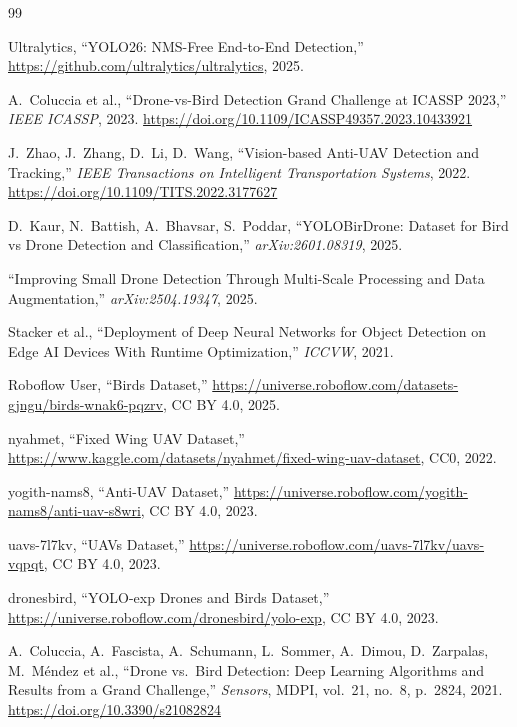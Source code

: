 \documentclass[12pt,a4paper]{report}
\begin{document}
\begin{thebibliography}{99}

Ultralytics, ``YOLO26: NMS-Free End-to-End Detection,''
\url{https://github.com/ultralytics/ultralytics}, 2025.

A.\ Coluccia et al.,
``Drone-vs-Bird Detection Grand Challenge at ICASSP 2023,''
\textit{IEEE ICASSP}, 2023.
\url{https://doi.org/10.1109/ICASSP49357.2023.10433921}

J.\ Zhao, J.\ Zhang, D.\ Li, D.\ Wang,
``Vision-based Anti-UAV Detection and Tracking,''
\textit{IEEE Transactions on Intelligent Transportation Systems}, 2022.
\url{https://doi.org/10.1109/TITS.2022.3177627}

D.\ Kaur, N.\ Battish, A.\ Bhavsar, S.\ Poddar,
``YOLOBirDrone: Dataset for Bird vs Drone Detection and Classification,''
\textit{arXiv:2601.08319}, 2025.

``Improving Small Drone Detection Through Multi-Scale Processing and
Data Augmentation,''
\textit{arXiv:2504.19347}, 2025.

Stacker et al.,
``Deployment of Deep Neural Networks for Object Detection on Edge AI
Devices With Runtime Optimization,''
\textit{ICCVW}, 2021.

Roboflow User, ``Birds Dataset,''
\url{https://universe.roboflow.com/datasets-gjngu/birds-wnak6-pqzrv},
CC BY 4.0, 2025.

nyahmet, ``Fixed Wing UAV Dataset,''
\url{https://www.kaggle.com/datasets/nyahmet/fixed-wing-uav-dataset},
CC0, 2022.

yogith-nams8, ``Anti-UAV Dataset,''
\url{https://universe.roboflow.com/yogith-nams8/anti-uav-s8wri},
CC BY 4.0, 2023.

uavs-7l7kv, ``UAVs Dataset,''
\url{https://universe.roboflow.com/uavs-7l7kv/uavs-vqpqt},
CC BY 4.0, 2023.

dronesbird, ``YOLO-exp Drones and Birds Dataset,''
\url{https://universe.roboflow.com/dronesbird/yolo-exp},
CC BY 4.0, 2023.

A.\ Coluccia, A.\ Fascista, A.\ Schumann, L.\ Sommer, A.\ Dimou,
D.\ Zarpalas, M.\ M\'{e}ndez et al.,
``Drone vs.\ Bird Detection: Deep Learning Algorithms and Results
from a Grand Challenge,''
\textit{Sensors}, MDPI, vol.\ 21, no.\ 8, p.\ 2824, 2021.
\url{https://doi.org/10.3390/s21082824}


\end{thebibliography}
\end{document}
